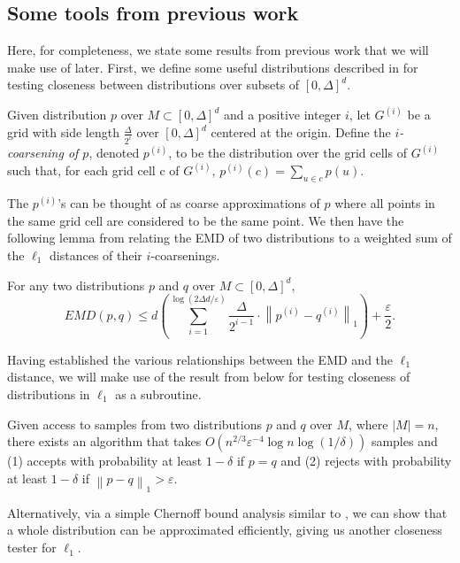 \documentclass[11pt]{article}
\newcommand{\eps}{\varepsilon}
\begin{document}
\subsection{Some tools from previous work}

Here, for completeness, we state some results from previous work that we will make use
of later. First, we define some useful distributions described in \cite{indyk}
for testing closeness between distributions over subsets of $[0, \Delta]^d$.

\begin{definition}
Given distribution $p$ over $M \subset [0, \Delta]^d$ and a positive integer $i$, let $G^{(i)}$ be a grid with side length $\frac{\Delta}{2^i}$ over $[0, \Delta]^d$ centered at the origin. Define the {\em $i$-coarsening of $p$}, denoted $p^{(i)}$, to be the distribution over the grid cells of $G^{(i)}$ such that, for each grid cell c of $G^{(i)}$, $p^{(i)}(c) = \sum_{u\in c} p(u)$.
\end{definition}

The $p^{(i)}$'s can be thought of as coarse approximations of $p$
where all points in the same grid cell are considered to be the same point.
We then have the following lemma from \cite{indyk} relating the EMD of two distributions
to a weighted sum of the $\ell_1$ distances of their $i$-coarsenings.
\begin{lemma}
\label{lemma:bindiv}
For any two distributions $p$ and $q$ over $M \subset [0, \Delta]^d$,
\[
  EMD(p, q) \leq d \left( \sum_{i=1}^{\log{(2\Delta d/\eps)}}
  		\frac{\Delta}{2^{i-1}}\cdot \left\| p^{(i)} - q^{(i)}\right\|_1  \right) + \frac{\eps}{2}.
\]
\end{lemma}

Having established the various relationships between the EMD and the $\ell_1$ distance,
we will make use of the result from \cite{L1tester} below for testing closeness of distributions
in $\ell_1$ as a subroutine.

\begin{theorem}\label{complexL1tester}
  Given access to samples from two distributions $p$ and $q$ over $M$, where $|M|=n$,
  there exists an algorithm that takes $O(n^{2/3}\eps^{-4}\log n\log(1/\delta))$
  samples and (1) accepts with probability at least $1-\delta$ if $p=q$
  and (2) rejects with probability at least $1-\delta$ if $\left\|p-q\right\|_1 > \eps$.
\end{theorem}

Alternatively, via a simple Chernoff bound analysis similar to \cite{L1indep},
we can show that a whole distribution can be approximated efficiently, giving
us another closeness tester for $\ell_1$.
\end{document}
